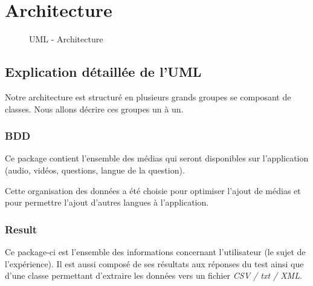\chapter{Architecture}
 
\begin{figure}[!h]
\begin{center}
  \caption{UML - Architecture}
  \label{diaglog} 
\end{center}
\end{figure}

\section{Explication détaillée de l'UML}

Notre architecture est structuré en plusieurs grands groupes se composant de classes. Nous allons décrire ces groupes un à un.

\subsection{BDD}

Ce package contient l'ensemble des médias qui seront disponibles sur l'application (audio, vidéos, questions, langue de la question).

Cette organisation des données a été choisie pour optimiser l'ajout de médias et pour permettre l'ajout d'autres langues à l'application.

\subsection{Result}

Ce package-ci est l'ensemble des informations concernant l'utilisateur (le sujet de l'expérience). Il est aussi composé de ses résultats aux réponses du test ainsi que d'une classe permettant d'extraire les données vers un fichier \textit{CSV / txt / XML}.


